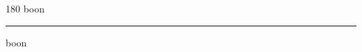 
\begin{frame}
\begin{center}
\begin{turn}{180}
{\fontsize{2.5cm}{1em}\selectfont boon}
\end{turn}
\vspace{1em}\par  
\hrule
\vspace{1em}\par  
{\fontsize{2.5cm}{1em}\selectfont boon}
\end{center}
\end{frame}
